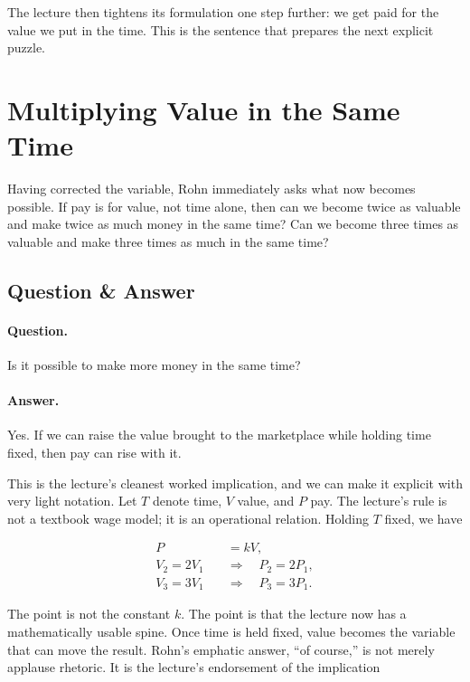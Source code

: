 The lecture then tightens its formulation one step further: we get paid for the value we put in the time. This is the sentence that prepares the next explicit puzzle.

\section{Multiplying Value in the Same Time}

Having corrected the variable, Rohn immediately asks what now becomes possible. If pay is for value, not time alone, then can we become twice as valuable and make twice as much money in the same time? Can we become three times as valuable and make three times as much in the same time?

\subsection{Question \& Answer}

\paragraph{Question.} Is it possible to make more money in the same time?

\paragraph{Answer.} Yes. If we can raise the value brought to the marketplace while holding time fixed, then pay can rise with it.

This is the lecture's cleanest worked implication, and we can make it explicit with very light notation. Let \(T\) denote time, \(V\) value, and \(P\) pay. The lecture's rule is not a textbook wage model; it is an operational relation. Holding \(T\) fixed, we have

\begin{align}
P &= kV,\\
V_2 = 2V_1 \quad &\Longrightarrow \quad P_2 = 2P_1,\\
V_3 = 3V_1 \quad &\Longrightarrow \quad P_3 = 3P_1.
\end{align}

The point is not the constant \(k\). The point is that the lecture now has a mathematically usable spine. Once time is held fixed, value becomes the variable that can move the result. Rohn's emphatic answer, “of course,” is not merely applause rhetoric. It is the lecture's endorsement of the implication

